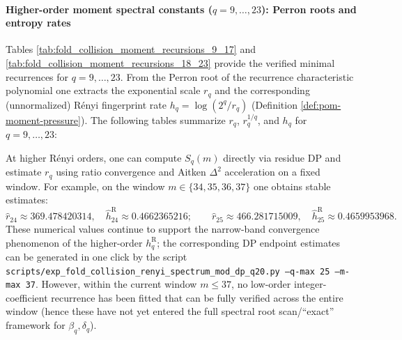 





\paragraph{Higher-order moment spectral constants (\texorpdfstring{$q=9,\dots,23$}{q=9..23}): Perron roots and entropy rates}
Tables \ref{tab:fold_collision_moment_recursions_9_17} and \ref{tab:fold_collision_moment_recursions_18_23} provide the verified minimal recurrences for \(q=9,\dots,23\).
From the Perron root of the recurrence characteristic polynomial one extracts the exponential scale \(r_q\) and the corresponding (unnormalized) R\'enyi fingerprint rate
\(
h_q=\log(2^q/r_q)
\)
(Definition \ref{def:pom-moment-pressure}).
The following tables summarize \(r_q\), \(r_q^{1/q}\), and \(h_q\) for \(q=9,\dots,23\):


\begin{remark}[Higher-order DP endpoint fingerprints (\(q=24,25\))]\label{rem:pom-renyi-endpoint-q24-25}
At higher R\'enyi orders, one can compute \(S_q(m)\) directly via residue DP and estimate \(r_q\) using ratio convergence and Aitken \(\Delta^2\) acceleration on a fixed window.
For example, on the window \(m\in\{34,35,36,37\}\) one obtains stable estimates:
\[
\widehat r_{24}\approx 369.478420314,\quad \widehat h_{24}^{\mathrm R}\approx 0.4662365216;\qquad
\widehat r_{25}\approx 466.281715009,\quad \widehat h_{25}^{\mathrm R}\approx 0.4659953968.
\]
These numerical values continue to support the narrow-band convergence phenomenon of the higher-order \(h_q^{\mathrm R}\); the corresponding DP endpoint estimates can be generated in one click by the script
\texttt{scripts/exp\_fold\_collision\_renyi\_spectrum\_mod\_dp\_q20.py --q-max 25 --m-max 37}.
However, within the current window \(m\le 37\), no low-order integer-coefficient recurrence has been fitted that can be fully verified across the entire window (hence these have not yet entered the full spectral root scan/``exact'' framework for \(\beta_q,\delta_q\)).
\end{remark}


